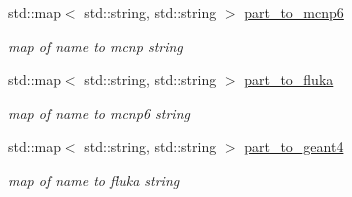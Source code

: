 \begin{DoxyCompactItemize}
\mbox{\label{namespacepyne_1_1particle_a340aac212ae5cf8666cc47654c0889c4}} 
std\+::map$<$ std\+::string, std\+::string $>$ \hyperlink{namespacepyne_1_1particle_a340aac212ae5cf8666cc47654c0889c4}{part\+\_\+to\+\_\+mcnp6}
\begin{DoxyCompactList}\small\item\em map of name to mcnp string \end{DoxyCompactList}\item 
\mbox{\label{namespacepyne_1_1particle_a670bcdff7df3bec5a47da5a228ef41cf}} 
std\+::map$<$ std\+::string, std\+::string $>$ \hyperlink{namespacepyne_1_1particle_a670bcdff7df3bec5a47da5a228ef41cf}{part\+\_\+to\+\_\+fluka}
\begin{DoxyCompactList}\small\item\em map of name to mcnp6 string \end{DoxyCompactList}\item 
\mbox{\label{namespacepyne_1_1particle_a6032672d7a6469328b8df984e7383eab}} 
std\+::map$<$ std\+::string, std\+::string $>$ \hyperlink{namespacepyne_1_1particle_a6032672d7a6469328b8df984e7383eab}{part\+\_\+to\+\_\+geant4}
\begin{DoxyCompactList}\small\item\em map of name to fluka string \end{DoxyCompactList}\end{DoxyCompactItemize}
